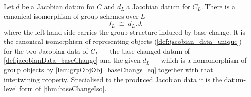 \begin{definition}
  \label{def:baseChangeIsoOfData}
  \leanok
  Let \(d\) be a Jacobian datum for \(C\) and \(d_L\) a Jacobian datum for \(C_L\). There is a
  canonical isomorphism of group schemes over \(L\)
  \[
    J_L \;\cong\; d_L.J ,
  \]
  where the left-hand side carries the group structure induced by base change. It is the canonical
  isomorphism of representing objects (\ref{def:jacobian_data_unique}) for the two Jacobian data of
  \(C_L\) --- the base-changed datum of \ref{def:jacobianData_baseChange} and the given \(d_L\) ---
  which is a homomorphism of group objects by \ref{lem:grpObjObj_baseChange_eq} together with that
  intertwining property. Specialised to the produced Jacobian data it is the datum-level form of
  \ref{thm:baseChangeIso}.
\end{definition}
